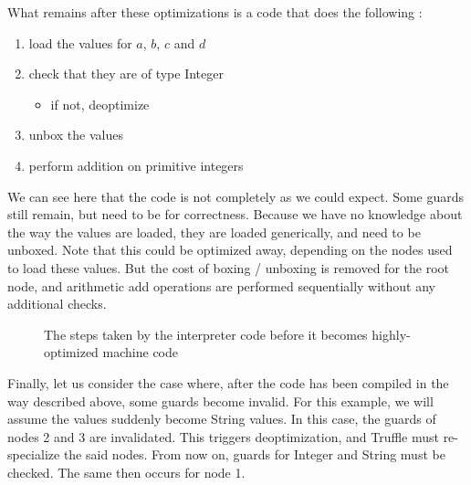 \documentclass[twoside,11pt,a4paper]{article}
\newcommand{\java}[1]{\textsf{#1}}
\begin{document}
What remains after these optimizations is a code that does the following :
\begin{enumerate}
\itemsep0em
\item load the values for $a$, $b$, $c$ and $d$
\item check that they are of type \java{Integer}
	\begin{itemize}
	\vspace{-1mm}
	\itemsep0em
	\item if not, deoptimize
	\end{itemize}
	\vspace{-1mm}
\item unbox the values
\item perform addition on primitive integers
\end{enumerate}

We can see here that the code is not completely as we could expect. Some guards still remain, but need to be for correctness. Because we have no knowledge about the way the values are loaded, they are loaded generically, and need to be unboxed. Note that this could be optimized away, depending on the nodes used to load these values. But the cost of boxing / unboxing is removed for the root node, and arithmetic add operations are performed sequentially without any additional checks.

\begin{figure}[t]
	\centering
	\caption{The steps taken by the interpreter code before it becomes highly-optimized machine code}
	\label{fig:visualex}
\end{figure}

Finally, let us consider the case where, after the code has been compiled in the way described above, some guards become invalid. For this example, we will assume the values suddenly become \java{String} values. In this case, the guards of nodes 2 and 3 are invalidated. This triggers deoptimization, and Truffle must re-specialize the said nodes. From now on, guards for \java{Integer} and \java{String} must be checked. The same then occurs for node 1.
\end{document}
